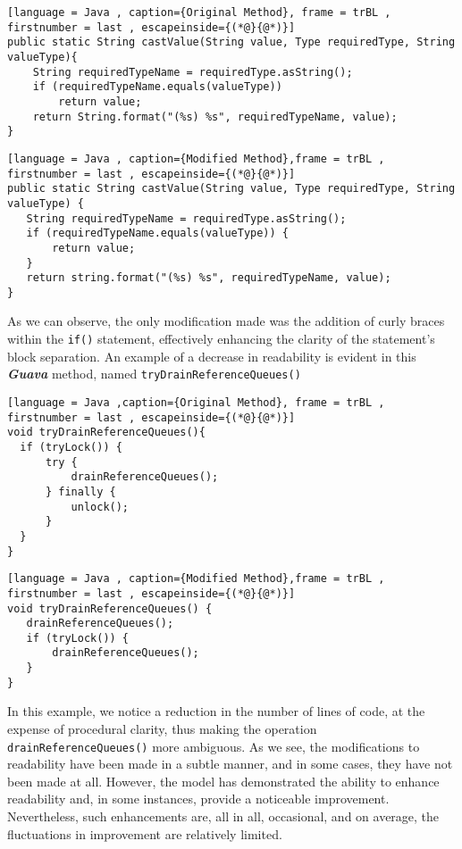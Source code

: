 \begin{lstlisting}[language = Java , caption={Original Method}, frame = trBL , firstnumber = last , escapeinside={(*@}{@*)}]
public static String castValue(String value, Type requiredType, String valueType){
    String requiredTypeName = requiredType.asString();
    if (requiredTypeName.equals(valueType))
        return value;
    return String.format("(%s) %s", requiredTypeName, value);
}
\end{lstlisting}
\begin{lstlisting}[language = Java , caption={Modified Method},frame = trBL , firstnumber = last , escapeinside={(*@}{@*)}]
public static String castValue(String value, Type requiredType, String valueType) { 
   String requiredTypeName = requiredType.asString(); 
   if (requiredTypeName.equals(valueType)) { 
       return value; 
   } 
   return string.format("(%s) %s", requiredTypeName, value); 
}
\end{lstlisting}
As we can observe, the only modification made was the addition of curly braces within the \texttt{if()} statement, effectively enhancing the clarity of the statement's block separation. An example of a decrease in readability is evident in  this \textbf{\textit{Guava}} method, named \texttt{tryDrainReferenceQueues()}
\begin{lstlisting}[language = Java ,caption={Original Method}, frame = trBL , firstnumber = last , escapeinside={(*@}{@*)}]
void tryDrainReferenceQueues(){
  if (tryLock()) {
      try {
          drainReferenceQueues();
      } finally {
          unlock();
      }
  }
}
\end{lstlisting}
\begin{lstlisting}[language = Java , caption={Modified Method},frame = trBL , firstnumber = last , escapeinside={(*@}{@*)}]
void tryDrainReferenceQueues() { 
   drainReferenceQueues(); 
   if (tryLock()) { 
       drainReferenceQueues(); 
   } 
}
\end{lstlisting}
In this example, we notice a reduction in the number of lines of code, at the expense of procedural clarity, thus making the operation \texttt{drainReferenceQueues()} more ambiguous. As we see, the modifications to readability have been made in a subtle manner, and in some cases, they have not been made at all. However, the model has demonstrated the ability to enhance readability and, in some instances, provide a noticeable improvement. Nevertheless, such enhancements are, all in all, occasional, and on average, the fluctuations in improvement are relatively limited.



